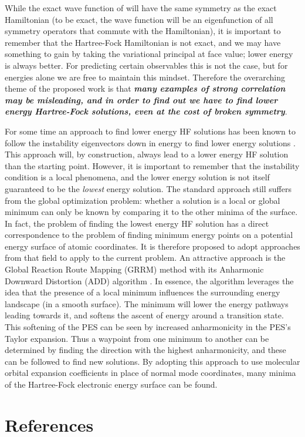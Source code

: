 \documentclass{revtex4}
\begin{document}
    While the exact wave function of will have the same symmetry as the exact 
    Hamiltonian (to be exact, the wave function will be an eigenfunction of all symmetry operators 
    that commute with the Hamiltonian), it is important to remember that the Hartree-Fock 
    Hamiltonian is not exact, and we 
    may have something to gain by taking the variational principal at face value; lower energy is 
    always better. For predicting certain observables this is not the case, but for energies alone 
    we are free 
    to maintain this mindset. Therefore the overarching theme of the proposed work is that 
    \emph{\bf{many 
    examples of strong correlation may be misleading, and in order to find out we have to find 
    lower 
    energy Hartree-Fock solutions, even at the cost of broken symmetry}}.    
    
    For some time an approach to find lower energy HF solutions has been known to follow the 
    instability eigenvectors down in energy 
    to find lower energy solutions \cite{Seeger1977}. This approach will, by construction, always 
    lead to a lower energy HF solution than the starting point. However, it is important to 
    remember that the instability condition is a local phenomena, and the lower energy solution is 
    not itself guaranteed to be the \emph{lowest} energy solution. The standard approach still 
    suffers 
    from the global optimization problem: whether a solution is a local or global minimum can only 
    be known by comparing it to the other minima of the surface. In fact, the problem of finding 
    the lowest energy HF solution has a direct correspondence to the problem of finding minimum 
    energy points on a potential energy surface of atomic coordinates. It is therefore proposed to 
    adopt approaches from that field to apply to the current problem. An attractive approach is the 
    Global Reaction Route Mapping (GRRM) method with its Anharmonic Downward Distortion (ADD) 
    algorithm \cite{Ohno2006}\cite{Ohno2016}. In essence, the algorithm leverages the idea that the 
    presence of a local minimum influences the surrounding energy landscape (in a smooth surface). 
    The minimum will lower the energy pathways leading towards it, and softens the ascent of energy 
    around a transition state. This softening of the PES can be seen by increased anharmonicity in 
    the PES's Taylor expansion. Thus a waypoint from one minimum to another can be determined by 
    finding the direction with the highest anharmonicity, and these can be followed to find new 
    solutions. By adopting this approach to use 
    molecular orbital expansion 
    coefficients in place of normal mode coordinates, many minima of the Hartree-Fock electronic 
    energy surface can be found. 
    
      

\section{References}

\end{document}
